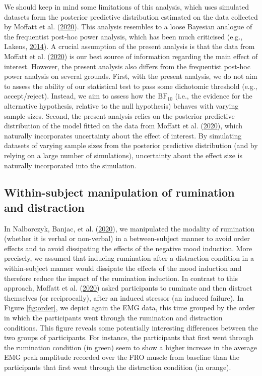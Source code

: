 \documentclass[
  english,
  man, donotrepeattitle,floatsintext]{apa6}
\begin{document}
We should keep in mind some limitations of this analysis, which uses simulated datasets form the posterior predictive distribution estimated on the data collected by Moffatt et al. (\protect\hyperlink{ref-moffatt_inner_2020}{2020}). This analysis resembles to a loose Bayesian analogue of the frequentist post-hoc power analysis, which has been much criticised (e.g., Lakens, \protect\hyperlink{ref-lakens_20_2014}{2014}). A crucial assumption of the present analysis is that the data from Moffatt et al. (\protect\hyperlink{ref-moffatt_inner_2020}{2020}) is our best source of information regarding the main effect of interest. However, the present analysis also differs from the frequentist post-hoc power analysis on several grounds. First, with the present analysis, we do not aim to assess the ability of our statistical test to pass some dichotomic threshold (e.g., accept/reject). Instead, we aim to assess how the \(\text{BF}_{10}\) (i.e., the evidence for the alternative hypothesis, relative to the null hypothesis) behaves with varying sample sizes. Second, the present analysis relies on the posterior predictive distribution of the model fitted on the data from Moffatt et al. (\protect\hyperlink{ref-moffatt_inner_2020}{2020}), which naturally incorporates uncertainty about the effect of interest. By simulating datasets of varying sample sizes from the posterior predictive distribution (and by relying on a large number of simulations), uncertainty about the effect size is naturally incorporated into the simulation.

\hypertarget{within-subject-manipulation-of-rumination-and-distraction}{%
\subsection{Within-subject manipulation of rumination and distraction}\label{within-subject-manipulation-of-rumination-and-distraction}}

In Nalborczyk, Banjac, et al. (\protect\hyperlink{ref-nalborczyk_dissociating_2020}{2020}), we manipulated the modality of rumination (whether it is verbal or non-verbal) in a between-subject manner to avoid order effects and to avoid dissipating the effects of the negative mood induction. More precisely, we assumed that inducing rumination after a distraction condition in a within-subject manner would dissipate the effects of the mood induction and therefore reduce the impact of the rumination induction. In contrast to this approach, Moffatt et al. (\protect\hyperlink{ref-moffatt_inner_2020}{2020}) asked participants to ruminate and then distract themselves (or reciprocally), after an induced stressor (an induced failure). In Figure \ref{fig:order}, we depict again the EMG data, this time grouped by the order in which the participants went through the rumination and distraction conditions. This figure reveals some potentially interesting differences between the two groups of participants. For instance, the participants that first went through the rumination condition (in green) seem to show a higher increase in the average EMG peak amplitude recorded over the FRO muscle from baseline than the participants that first went through the distraction condition (in orange).
\end{document}
